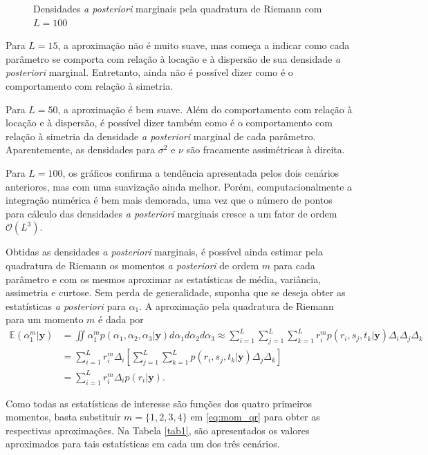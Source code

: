 \begin{figure}[t]
	\caption{Densidades \textit{a posteriori} marginais pela quadratura de Riemann com $L = 100$}%
\end{figure}

Para $L=15$, a aproximação não é muito suave, mas começa a indicar como cada parâmetro se comporta com relação à locação e à dispersão de sua densidade \textit{a posteriori} marginal. Entretanto, ainda não é possível dizer como é o comportamento com relação à simetria.

Para $L=50$, a aproximação é bem suave. Além do comportamento com relação à locação e à dispersão, é possível dizer também como é o comportamento com relação à simetria da densidade \textit{a posteriori} marginal de cada parâmetro. Aparentemente, as densidades para $\sigma^2$ e $\nu$ são fracamente assimétricas à direita.

Para $L=100$, os gráficos confirma a tendência apresentada pelos dois cenários anteriores, mas com uma suavização ainda melhor. Porém, computacionalmente a integração numérica é bem mais demorada, uma vez que o número de pontos para cálculo das densidades \textit{a posteriori} marginais cresce a um fator de ordem $\mathcal{O}(L^3)$.

Obtidas as densidades \textit{a posteriori} marginais, é possível ainda estimar pela quadratura de Riemann os momentos \textit{a posteriori} de ordem $m$ para cada parâmetro e com os mesmos aproximar as estatísticas de média, variância, assimetria e curtose. Sem perda de generalidade, suponha que se deseja obter as estatísticas \textit{a posteriori} para $\alpha_1$. A aproximação pela quadratura de Riemann para um momento $m$ é dada por
\begin{align}
\mathbb{E}(\alpha_1^m | \bm{y}) &= \iint \alpha_1^m p(\alpha_1, \alpha_2, \alpha_3 | \bm{y}) d\alpha_1 d\alpha_2 d\alpha_3 \approx \sum_{i=1}^{L} \sum_{j=1}^{L} \sum_{k=1}^{L} r_i^m p(r_i, s_j, t_k | \bm{y}) \Delta_i \Delta_j \Delta_k \nonumber \\
&= \sum_{i=1}^{L} r_i^m \Delta_i \left[\sum_{j=1}^{L} \sum_{k=1}^{L} p(r_i, s_j, t_k | \bm{y}) \Delta_j \Delta_k\right] \nonumber \\
&= \sum_{i=1}^{L} r_i^m \Delta_i p(r_i | \bm{y}). \label{eq:mom_qr}
\end{align}

Como todas as estatísticas de interesse são funções dos quatro primeiros momentos, basta substituir $m = \{1, 2, 3, 4\}$ em \eqref{eq:mom_qr} para obter as respectivas aproximações. Na Tabela \ref{tab1}, são apresentados os valores aproximados para tais estatísticas em cada um dos três cenários.

